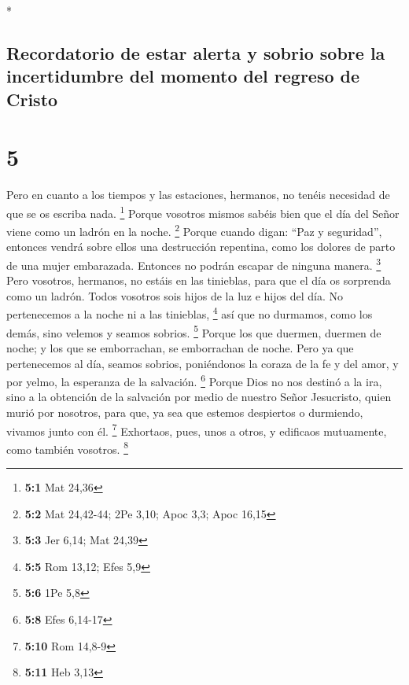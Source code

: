 \begin{paracol}{2}
\switchcolumn[0]*

\hypertarget{recordatorio-de-estar-alerta-y-sobrio-sobre-la-incertidumbre-del-momento-del-regreso-de-cristo}{%
\subsection{Recordatorio de estar alerta y sobrio sobre la incertidumbre
del momento del regreso de
Cristo}\label{recordatorio-de-estar-alerta-y-sobrio-sobre-la-incertidumbre-del-momento-del-regreso-de-cristo}}

\hypertarget{section-8}{%
\section{5}\label{section-8}}

 Pero en cuanto a los tiempos y las estaciones, hermanos,
no tenéis necesidad de que se os escriba nada. \footnote{\textbf{5:1}
  Mat 24,36}  Porque vosotros mismos sabéis bien que el
día del Señor viene como un ladrón en la noche. \footnote{\textbf{5:2}
  Mat 24,42-44; 2Pe 3,10; Apoc 3,3; Apoc 16,15}  Porque
cuando digan: ``Paz y seguridad'', entonces vendrá sobre ellos una
destrucción repentina, como los dolores de parto de una mujer
embarazada. Entonces no podrán escapar de ninguna manera. \footnote{\textbf{5:3}
  Jer 6,14; Mat 24,39}  Pero vosotros, hermanos, no estáis
en las tinieblas, para que el día os sorprenda como un ladrón.
 Todos vosotros sois hijos de la luz e hijos del día. No
pertenecemos a la noche ni a las tinieblas, \footnote{\textbf{5:5} Rom
  13,12; Efes 5,9}  así que no durmamos, como los demás,
sino velemos y seamos sobrios. \footnote{\textbf{5:6} 1Pe 5,8}
 Porque los que duermen, duermen de noche; y los que se
emborrachan, se emborrachan de noche.  Pero ya que
pertenecemos al día, seamos sobrios, poniéndonos la coraza de la fe y
del amor, y por yelmo, la esperanza de la salvación. \footnote{\textbf{5:8}
  Efes 6,14-17}  Porque Dios no nos destinó a la ira, sino
a la obtención de la salvación por medio de nuestro Señor Jesucristo,
 quien murió por nosotros, para que, ya sea que estemos
despiertos o durmiendo, vivamos junto con él. \footnote{\textbf{5:10}
  Rom 14,8-9}  Exhortaos, pues, unos a otros, y edificaos
mutuamente, como también vosotros. \footnote{\textbf{5:11} Heb 3,13}

\hypertarget{deberes-de-los-feligreses-hacia-los-luxedderes-parroquiales}{%
}
\end{paracol}
